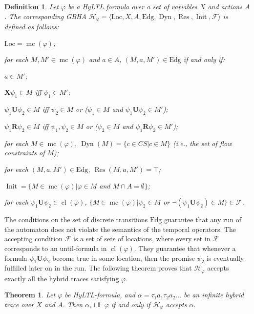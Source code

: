 \documentclass[submission,copyright,creativecommons]{eptcs}
\newcommand{\hyltl}{\textsf{HyLTL}\xspace}
\newcommand{\X}{\ensuremath{\mathbin{\mathbf{X}}}\xspace}
\newcommand{\U}{\ensuremath{\mathbin{\mathbf{U}}}\xspace}
\newcommand{\R}{\ensuremath{\mathbin{\mathbf{R}}}\xspace}
\newcommand{\fcs}{\ensuremath{CS}\xspace}
\newcommand{\mmodels}{\Vdash}
\DeclareMathOperator{\cl}{cl}
\DeclareMathOperator{\cs}{mc}
\newtheorem{definition}{Definition}
\newtheorem{theorem}{Theorem}
\newcommand{\cvF}{\mathcal{F}}
\newcommand{\autH}{\mathcal{H}}
\newcommand{\Loc}{\mathrm{Loc}}
\newcommand{\Edg}{\mathrm{Edg}}
\DeclareMathOperator{\Dyn}{{Dyn}}
\DeclareMathOperator{\Res}{{Res}}
\DeclareMathOperator{\Init}{{Init}}
\begin{document}
\begin{definition}\label{def:gbha-varphi}
Let $\varphi$ be a \hyltl formula over a set of variables $X$ and actions $A$. The corresponding GBHA $\autH_\varphi = \langle\Loc,X,A,\Edg,\Dyn,\Res,\Init,\cvF\rangle$ is defined as follows:
\begin{compactitem}
	\item $\Loc = \cs(\varphi)$;
	\item for each $M, M' \in \cs(\varphi)$ and $a \in A$, $(M,a,M') \in \Edg$ if and only if:
		\begin{compactitem}
			\item $a \in M'$;
			\item $\X \psi_1 \in M$ iff $\psi_1 \in M'$;
			\item $\psi_1 \U \psi_2 \in M$ iff $\psi_2 \in M$ or ($\psi_1 \in M$ and $\psi_1 \U \psi_2 \in M'$);
			\item $\psi_1 \R \psi_2 \in M$ iff $\psi_1,\psi_2 \in M$ or ($\psi_2\in M$ and $\psi_1 \R \psi_2 \in M'$);
		\end{compactitem}
	\item for each $M \in \cs(\varphi)$, $\Dyn(M) = \{c \in \fcs | c \in M\}$ (i.e., the set of flow constraints of $M$);
	\item for each $(M, a, M') \in \Edg$, $\Res(M, a, M') = \top$;
	\item $\Init = \{M \in \cs(\varphi) | \varphi \in M$ and $M \cap A = \emptyset\}$;
	\item for each $\psi_1 \U \psi_2 \in \cl(\varphi)$, $\{M \in \cs(\varphi) | \psi_2 \in M$ or $\neg(\psi_1 \U \psi_2) \in M\} \in \cvF$.
\end{compactitem}
\end{definition}

The conditions on the set of discrete transitions $\Edg$ guarantee that any run of the automaton does not violate the semantics of the temporal operators. The accepting condition $\cvF$ is a set of sets of locations, where every set in $\cvF$ corresponds to an until-formula in $\cl(\varphi)$. They guarantee that whenever a formula $\psi_1 \U \psi_2$ become true in some location, then the promise $\psi_2$ is eventually fulfilled later on in the run.
The following theorem proves that $\autH_\varphi$ accepts exactly all the hybrid traces satisfying $\varphi$.

\begin{theorem}\label{teo:main}
Let $\varphi$ be \hyltl-formula, and $\alpha = \tau_1 a_1 \tau_2 a_2 \ldots$ be an infinite hybrid trace over $X$ and $A$. Then $\alpha,1 \mmodels \varphi$ if and only if $\autH_\varphi$ accepts $\alpha$.
\end{theorem}
\end{document}
